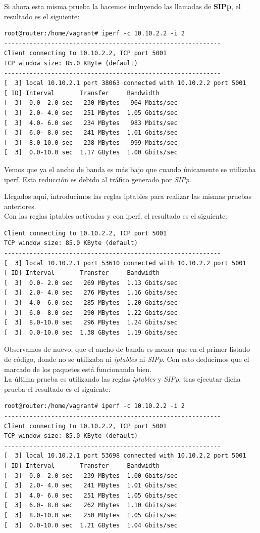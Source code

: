 \documentclass[11pt]{article}
\begin{document}
Si ahora esta misma prueba la hacemos incluyendo las llamadas de \textbf{SIPp}, el resultado es el siguiente:

\begin{lstlisting}[style=C,numbers=none]
root@router:/home/vagrant# iperf -c 10.10.2.2 -i 2
------------------------------------------------------------
Client connecting to 10.10.2.2, TCP port 5001
TCP window size: 85.0 KByte (default)
------------------------------------------------------------
[  3] local 10.10.2.1 port 38063 connected with 10.10.2.2 port 5001
[ ID] Interval       Transfer     Bandwidth
[  3]  0.0- 2.0 sec   230 MBytes   964 Mbits/sec
[  3]  2.0- 4.0 sec   251 MBytes  1.05 Gbits/sec
[  3]  4.0- 6.0 sec   234 MBytes   983 Mbits/sec
[  3]  6.0- 8.0 sec   241 MBytes  1.01 Gbits/sec
[  3]  8.0-10.0 sec   238 MBytes   999 Mbits/sec
[  3]  0.0-10.0 sec  1.17 GBytes  1.00 Gbits/sec
\end{lstlisting}

Vemos que ya el ancho de banda es más bajo que cuando únicamente se utilizaba iperf. Esta reducción es debido al tráfico generado por \textit{SIPp}.

Llegados aquí, introducimos las reglas iptables para realizar las mismas pruebas anteriores.\\
Con las reglas iptables activadas y con iperf, el resultado es el siguiente:
\begin{lstlisting}[style=C,numbers=none]
Client connecting to 10.10.2.2, TCP port 5001
TCP window size: 85.0 KByte (default)
------------------------------------------------------------
[  3] local 10.10.2.1 port 53610 connected with 10.10.2.2 port 5001
[ ID] Interval       Transfer     Bandwidth
[  3]  0.0- 2.0 sec   269 MBytes  1.13 Gbits/sec
[  3]  2.0- 4.0 sec   276 MBytes  1.16 Gbits/sec
[  3]  4.0- 6.0 sec   285 MBytes  1.20 Gbits/sec
[  3]  6.0- 8.0 sec   290 MBytes  1.22 Gbits/sec
[  3]  8.0-10.0 sec   296 MBytes  1.24 Gbits/sec
[  3]  0.0-10.0 sec  1.38 GBytes  1.19 Gbits/sec
\end{lstlisting}
Observamos de nuevo, que el ancho de banda es menor que en el primer listado de código, donde no se utilizaba ni \textit{iptables} ni \textit{SIPp}. Con esto deducimos que el marcado de los paquetes está funcionando bien. \\

La última prueba es utilizando las reglas \textit{iptables} y \textit{SIPp}, tras ejecutar dicha prueba el resultado es el siguiente:
\begin{lstlisting}[style=C,numbers=none]
root@router:/home/vagrant# iperf -c 10.10.2.2 -i 2
------------------------------------------------------------
Client connecting to 10.10.2.2, TCP port 5001
TCP window size: 85.0 KByte (default)
------------------------------------------------------------
[  3] local 10.10.2.1 port 53698 connected with 10.10.2.2 port 5001
[ ID] Interval       Transfer     Bandwidth
[  3]  0.0- 2.0 sec   239 MBytes  1.00 Gbits/sec
[  3]  2.0- 4.0 sec   241 MBytes  1.01 Gbits/sec
[  3]  4.0- 6.0 sec   251 MBytes  1.05 Gbits/sec
[  3]  6.0- 8.0 sec   262 MBytes  1.10 Gbits/sec
[  3]  8.0-10.0 sec   250 MBytes  1.05 Gbits/sec
[  3]  0.0-10.0 sec  1.21 GBytes  1.04 Gbits/sec
\end{lstlisting}
\end{document}

